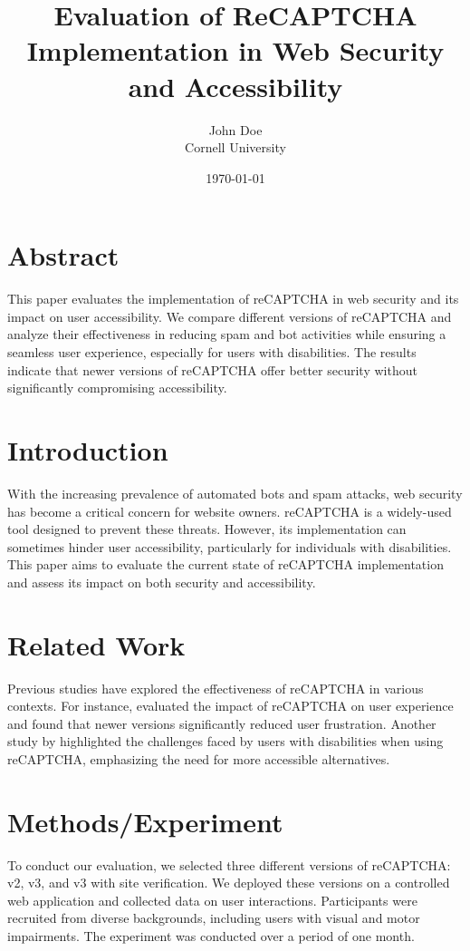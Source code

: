 \documentclass{article}
\title{Evaluation of ReCAPTCHA Implementation in Web Security and Accessibility}
\author{John Doe \\ Cornell University}
\date{\today}
\begin{document}
\maketitle

\section{Abstract}
This paper evaluates the implementation of reCAPTCHA in web security and its impact on user accessibility. We compare different versions of reCAPTCHA and analyze their effectiveness in reducing spam and bot activities while ensuring a seamless user experience, especially for users with disabilities. The results indicate that newer versions of reCAPTCHA offer better security without significantly compromising accessibility.

\section{Introduction}
With the increasing prevalence of automated bots and spam attacks, web security has become a critical concern for website owners. reCAPTCHA is a widely-used tool designed to prevent these threats. However, its implementation can sometimes hinder user accessibility, particularly for individuals with disabilities. This paper aims to evaluate the current state of reCAPTCHA implementation and assess its impact on both security and accessibility.

\section{Related Work}
Previous studies have explored the effectiveness of reCAPTCHA in various contexts. For instance, \cite{chandrasekar2020re} evaluated the impact of reCAPTCHA on user experience and found that newer versions significantly reduced user frustration. Another study by \cite{kumar2021accessibility} highlighted the challenges faced by users with disabilities when using reCAPTCHA, emphasizing the need for more accessible alternatives.

\section{Methods/Experiment}
To conduct our evaluation, we selected three different versions of reCAPTCHA: v2, v3, and v3 with site verification. We deployed these versions on a controlled web application and collected data on user interactions. Participants were recruited from diverse backgrounds, including users with visual and motor impairments. The experiment was conducted over a period of one month.
\end{document}
